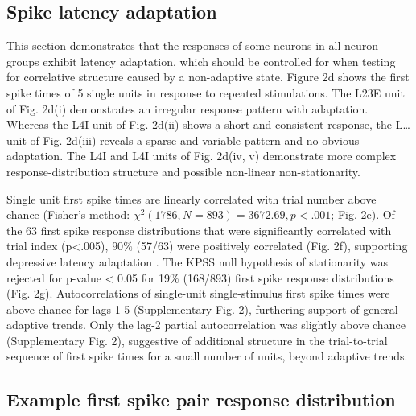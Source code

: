 \documentclass{article}
\begin{document}
\subsection*{Spike latency adaptation}


This section demonstrates that the responses of some neurons in all neuron-groups exhibit latency adaptation, which should be controlled for when testing for correlative structure caused by a non-adaptive state. Figure 2d shows the first spike times of 5 single units in response to repeated stimulations. The L23E unit of Fig. 2d(i) demonstrates an irregular response pattern with adaptation. Whereas the L4I unit of Fig. 2d(ii) shows a short and consistent response, the L… unit of Fig. 2d(iii) reveals a sparse and variable pattern and no obvious adaptation. The L4I and L4I units of Fig. 2d(iv, v) demonstrate more complex response-distribution structure and possible non-linear non-stationarity. 

Single unit first spike times are linearly correlated with trial number above chance (Fisher's method: $\chi^{2} (1786, N = 893) = 3672.69, p<.001$; Fig. 2e).
Of the 63 first spike response distributions that were significantly correlated with trial index (p<.005), $90\%$ (57/63) were positively correlated (Fig. 2f), supporting depressive latency adaptation \cite{ahissar2000transformation, ahissar2001temporal, kheradpezhouh2017response}. The KPSS null hypothesis of stationarity was rejected for p-value < 0.05 for 19\% (168/893) first spike response distributions (Fig. 2g). Autocorrelations of single-unit single-stimulus first spike times were above chance for lags 1-5 (Supplementary Fig. 2), furthering support of general adaptive trends. Only the lag-2 partial autocorrelation was slightly above chance (Supplementary Fig. 2), suggestive of additional structure in the trial-to-trial sequence of first spike times for a small number of units, beyond adaptive trends.


\subsection*{Example first spike pair response distribution}
\end{document}

